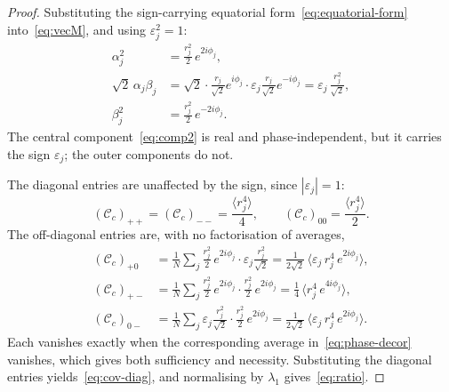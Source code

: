 \documentclass[11pt,a4paper]{article}
\begin{document}
  \begin{proof}
    Substituting the sign-carrying equatorial form~\eqref{eq:equatorial-form}
    into~\eqref{eq:vecM}, and using $\varepsilon_j^2 = 1$:
    \begin{align}
      \alpha_j^2 &= \frac{r_j^2}{2}\, e^{2i\phi_j}, \label{eq:comp1}\\
      \sqrt{2}\,\alpha_j \beta_j
      &= \sqrt{2}\cdot \frac{r_j}{\sqrt{2}} e^{i\phi_j}
        \cdot \varepsilon_j \frac{r_j}{\sqrt{2}} e^{-i\phi_j}
      = \varepsilon_j\, \frac{r_j^2}{\sqrt{2}}, \label{eq:comp2}\\
      \beta_j^2 &= \frac{r_j^2}{2}\, e^{-2i\phi_j}. \label{eq:comp3}
    \end{align}
    The central component~\eqref{eq:comp2} is real and phase-independent, but it carries the sign
    $\varepsilon_j$; the outer components do not.

    The diagonal entries are unaffected by the sign, since $|\varepsilon_j| = 1$:
    \[
      (\mathcal{C}_c)_{++} = (\mathcal{C}_c)_{--} = \frac{\langle r_j^4 \rangle}{4},
      \qquad
      (\mathcal{C}_c)_{00} = \frac{\langle r_j^4 \rangle}{2}.
    \]
    The off-diagonal entries are, with no factorisation of averages,
    \begin{align}
      (\mathcal{C}_c)_{+0}
      &= \frac{1}{N}\sum_j \frac{r_j^2}{2}\, e^{2i\phi_j}
         \cdot \varepsilon_j \frac{r_j^2}{\sqrt{2}}
      = \frac{1}{2\sqrt{2}}\,
        \bigl\langle \varepsilon_j\, r_j^4\, e^{2i\phi_j} \bigr\rangle,
        \label{eq:c12}\\
      (\mathcal{C}_c)_{+-}
      &= \frac{1}{N}\sum_j \frac{r_j^2}{2}\, e^{2i\phi_j}
         \cdot \frac{r_j^2}{2}\, e^{2i\phi_j}
      = \frac{1}{4}\, \bigl\langle r_j^4\, e^{4i\phi_j} \bigr\rangle,
        \label{eq:c13}\\
      (\mathcal{C}_c)_{0-}
      &= \frac{1}{N}\sum_j \varepsilon_j \frac{r_j^2}{\sqrt{2}}
         \cdot \frac{r_j^2}{2}\, e^{2i\phi_j}
      = \frac{1}{2\sqrt{2}}\,
        \bigl\langle \varepsilon_j\, r_j^4\, e^{2i\phi_j} \bigr\rangle .
        \label{eq:c23}
    \end{align}
    Each vanishes exactly when the corresponding average in~\eqref{eq:phase-decor} vanishes, which
    gives both sufficiency and necessity.
    Substituting the diagonal entries yields~\eqref{eq:cov-diag}, and normalising by $\lambda_1$
    gives~\eqref{eq:ratio}.
  \end{proof}
\end{document}
